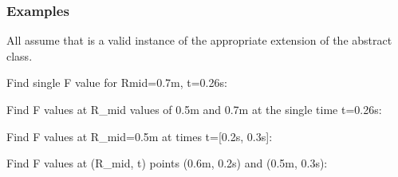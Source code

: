 \documentclass[letterpaper,10pt,english]{sphinxmanual}
\begin{document}
\begin{fulllineitems}
\begin{fulllineitems}
\begin{quote}
\begin{description}
\begin{itemize}
\end{itemize}


\end{description}\end{quote}
\subsubsection*{Examples}

All assume that  is a valid instance of the appropriate
extension of the {\hyperref[\detokenize{eqtools:eqtools.core.Equilibrium}]{}} abstract class.

Find single F value for Rmid=0.7m, t=0.26s:

\begin{sphinxVerbatim}[commandchars=\\\{\}]
   
\end{sphinxVerbatim}

Find F values at R\_mid values of 0.5m and 0.7m at the single time
t=0.26s:

\begin{sphinxVerbatim}[commandchars=\\\{\}]
  \PYG{p}{[} \PYG{p}{]} 
\end{sphinxVerbatim}

Find F values at R\_mid=0.5m at times t={[}0.2s, 0.3s{]}:

\begin{sphinxVerbatim}[commandchars=\\\{\}]
   \PYG{p}{[} \PYG{p}{]}
\end{sphinxVerbatim}

Find F values at (R\_mid, t) points (0.6m, 0.2s) and (0.5m, 0.3s):

\begin{sphinxVerbatim}[commandchars=\\\{\}]
  \PYG{p}{[} \PYG{p}{]} \PYG{p}{[} \PYG{p}{]} 
\end{sphinxVerbatim}


\end{fulllineitems}
\end{fulllineitems}
\end{document}

